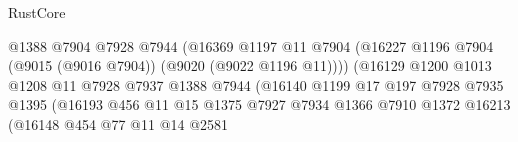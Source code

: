 \begin{lexlean}{RustCore}
\begin{coremodule}
                                              @1388
                                              @7904
                                              @7928
                                              @7944
                                              (@16369
                                                @1197
                                                @11
                                                @7904
                                                (@16227
                                                  @1196
                                                  @7904
                                                  (@9015 (@9016 @7904))
                                                  (@9020 (@9022 @1196 @11))))
                                              (@16129
                                                @1200
                                                @1013
                                                @1208
                                                @11
                                                @7928
                                                @7937
                                                @1388
                                                @7944
                                                (@16140
                                                  @1199
                                                  @17
                                                  @197
                                                  @7928
                                                  @7935
                                                  @1395
                                                  (@16193
                                                    @456
                                                    @11
                                                    @15
                                                    @1375
                                                    @7927
                                                    @7934
                                                    @1366
                                                    @7910
                                                    @1372
                                                    @16213
                                                    (@16148
                                                      @454
                                                      @77
                                                      @11
                                                      @14
                                                      @2581

\end{coremodule}
\end{lexlean}
